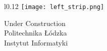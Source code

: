 
\begin{titlepage}
	\begin{wrapfigure}{l}{0.12\linewidth}
		\texttt{[image: left\_strip.png]}
	\end{wrapfigure}
	Under Construction \\
	\noindent
	Politechnika Łódzka\\
	\textcolor{defaultRed}{Instytut Informatyki}
\end{titlepage}